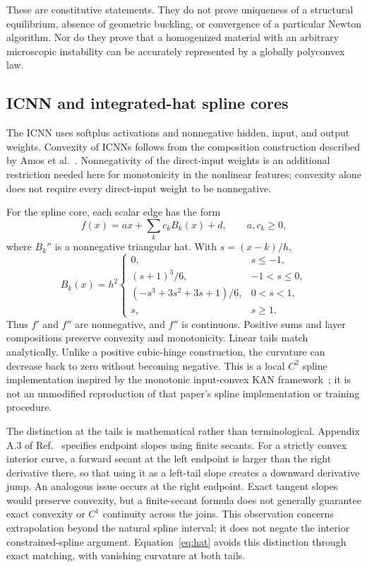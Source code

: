\documentclass[10pt,a4paper]{article}
\begin{document}
These are constitutive statements. They do not prove uniqueness of a structural equilibrium, absence of geometric buckling, or convergence of a particular Newton algorithm. Nor do they prove that a homogenized material with an arbitrary microscopic instability can be accurately represented by a globally polyconvex law.

\subsection{ICNN and integrated-hat spline cores}
The ICNN uses softplus activations and nonnegative hidden, input, and output weights. Convexity of ICNNs follows from the composition construction described by Amos et al.~\cite{amos2017}. Nonnegativity of the direct-input weights is an additional restriction needed here for monotonicity in the nonlinear features; convexity alone does not require every direct-input weight to be nonnegative.

For the spline core, each scalar edge has the form
\begin{equation}
 f(x)=a x+\sum_k c_k B_k(x)+d,\qquad a,c_k\geq0,
 \label{eq:splineedge}
\end{equation}
where $B_k''$ is a nonnegative triangular hat. With $s=(x-k)/h$,
\begin{equation}
 B_k(x)=h^2\begin{cases}
 0,&s\leq-1,\\
 (s+1)^3/6,&-1<s\leq0,\\
 (-s^3+3s^2+3s+1)/6,&0<s<1,\\
 s,&s\geq1.
 \end{cases}
 \label{eq:hat}
\end{equation}
Thus $f'$ and $f''$ are nonnegative, and $f''$ is continuous. Positive sums and layer compositions preserve convexity and monotonicity. Linear tails match analytically. Unlike a positive cubic-hinge construction, the curvature can decrease back to zero without becoming negative. This is a local $C^2$ spline implementation inspired by the monotonic input-convex KAN framework~\cite{thakolkaran2025}; it is not an unmodified reproduction of that paper's spline implementation or training procedure.

The distinction at the tails is mathematical rather than terminological. Appendix A.3 of Ref.~\cite{thakolkaran2025} specifies endpoint slopes using finite secants. For a strictly convex interior curve, a forward secant at the left endpoint is larger than the right derivative there, so that using it as a left-tail slope creates a downward derivative jump. An analogous issue occurs at the right endpoint. Exact tangent slopes would preserve convexity, but a finite-secant formula does not generally guarantee exact convexity or $C^1$ continuity across the joins. This observation concerns extrapolation beyond the natural spline interval; it does not negate the interior constrained-spline argument. Equation~\eqref{eq:hat} avoids this distinction through exact matching, with vanishing curvature at both tails.
\end{document}
